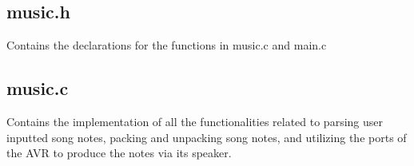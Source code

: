\documentclass[usletter, 12pt]{article}
\begin{document}
        \subsection{music.h}
        Contains the declarations for the functions in music.c and main.c

        \subsection{music.c}
        Contains the implementation of all the functionalities related to parsing user inputted song notes, packing and unpacking song notes, and utilizing the ports of the AVR to produce the notes via its speaker.
\end{document}
